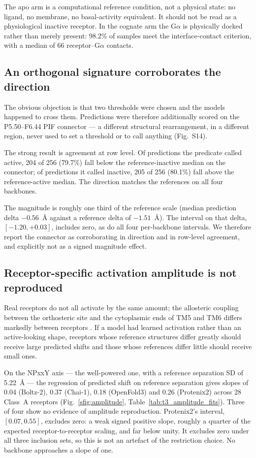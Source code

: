 The apo arm is a computational reference condition, not a physical state: no
ligand, no membrane, no basal-activity equivalent. It should not be read as a
physiological inactive receptor. In the cognate arm the G$\alpha$ is physically
docked rather than merely present: 98.2\% of samples meet the interface-contact
criterion, with a median of 66 receptor--G$\alpha$ contacts.

\subsection*{An orthogonal signature corroborates the direction}

The obvious objection is that two thresholds were chosen and the models happened
to cross them. Predictions were therefore additionally scored on the
P5.50--F6.44 PIF connector --- a different structural rearrangement, in a
different region, never used to set a threshold or to call anything (Fig.~S14).

The strong result is agreement at row level. Of predictions the predicate called
active, 204 of 256 (79.7\%) fall below the reference-inactive median on the
connector; of predictions it called inactive, 205 of 256 (80.1\%) fall above the
reference-active median. The direction matches the references on all four
backbones.

The magnitude is roughly one third of the reference scale (median prediction
delta $-0.56$~\AA{} against a reference delta of $-1.51$~\AA). The interval on
that delta, $[-1.20, +0.03]$, includes zero, as do all four per-backbone
intervals. We therefore report the connector as corroborating in direction and
in row-level agreement, and explicitly not as a signed magnitude effect.

\subsection*{Receptor-specific activation amplitude is not reproduced}

Real receptors do not all activate by the same amount; the allosteric coupling
between the orthosteric site and the cytoplasmic ends of TM5 and TM6 differs
markedly between receptors \citep[p.~3698]{georgiou2025heterogeneity}. If a model
had learned
activation rather than an active-looking shape, receptors whose reference
structures differ greatly should receive large predicted shifts and those whose
references differ little should receive small ones.

On the NPxxY axis --- the well-powered one, with a reference separation SD of
5.22~\AA{} --- the regression of predicted shift on reference separation gives
slopes of 0.04 (Boltz-2), 0.37 (Chai-1), 0.18 (OpenFold3) and 0.26 (Protenix2)
across 28 Class~A receptors (Fig.~\ref{sfig:amplitude}, Table~\ref{tab:t3_amplitude_fits}). Three of four show no evidence of
amplitude reproduction. Protenix2's interval, $[0.07, 0.55]$, excludes zero: a
weak signed positive slope, roughly a quarter of the expected
receptor-to-receptor scaling, and far below unity. It excludes zero under all
three inclusion sets, so this is not an artefact of the restriction choice. No
backbone approaches a slope of one.

